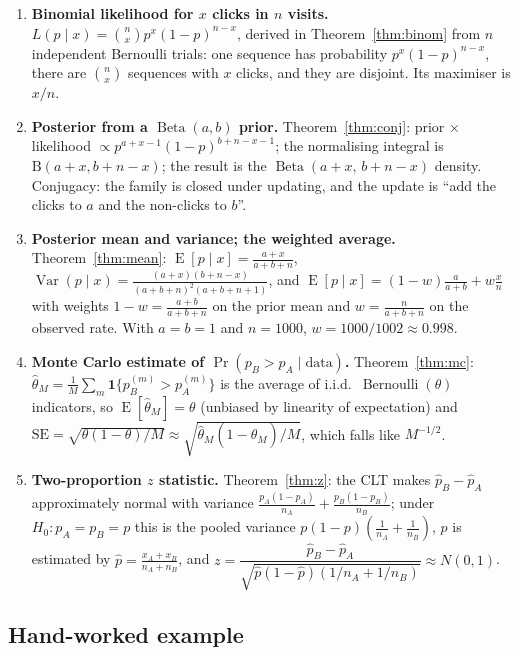 \documentclass[11pt]{article}
\theoremstyle{definition}
\theoremstyle{remark}
\renewcommand{\Pr}{\operatorname{Pr}}
\newcommand{\E}{\operatorname{E}}
\newcommand{\Var}{\operatorname{Var}}
\newcommand{\Ber}{\operatorname{Bernoulli}}
\newcommand{\Betad}{\operatorname{Beta}}
\newcommand{\Bfun}{\mathrm{B}}
\newcommand{\ind}[1]{\mathbf{1}\{#1\}}
\newcommand{\data}{\text{data}}
\begin{document}
\begin{enumerate}[label=\textbf{Q\arabic*.},leftmargin=*]
\item \textbf{Binomial likelihood for $x$ clicks in $n$ visits.}
  $L(p\mid x)=\binom nx p^x(1-p)^{n-x}$, derived in Theorem~\ref{thm:binom} from $n$ independent Bernoulli
  trials: one sequence has probability $p^x(1-p)^{n-x}$, there are $\binom nx$ sequences with $x$ clicks, and
  they are disjoint. Its maximiser is $x/n$.

\item \textbf{Posterior from a $\Betad(a,b)$ prior.}
  Theorem~\ref{thm:conj}: prior $\times$ likelihood $\propto p^{a+x-1}(1-p)^{b+n-x-1}$; the normalising
  integral is $\Bfun(a+x,b+n-x)$; the result is the $\Betad(a+x,\,b+n-x)$ density. Conjugacy: the family is
  closed under updating, and the update is ``add the clicks to $a$ and the non-clicks to $b$''.

\item \textbf{Posterior mean and variance; the weighted average.}
  Theorem~\ref{thm:mean}:
  $\E[p\mid x]=\frac{a+x}{a+b+n}$, $\Var(p\mid x)=\frac{(a+x)(b+n-x)}{(a+b+n)^2(a+b+n+1)}$, and
  $\E[p\mid x]=(1-w)\frac{a}{a+b}+w\frac xn$ with weights $1-w=\frac{a+b}{a+b+n}$ on the prior mean and
  $w=\frac{n}{a+b+n}$ on the observed rate. With $a=b=1$ and $n=1000$, $w=1000/1002\approx0.998$.

\item \textbf{Monte Carlo estimate of $\Pr(p_B>p_A\mid\data)$.}
  Theorem~\ref{thm:mc}: $\hat\theta_M=\frac1M\sum_m\ind{p_B^{(m)}>p_A^{(m)}}$ is the average of i.i.d.\
  $\Ber(\theta)$ indicators, so $\E[\hat\theta_M]=\theta$ (unbiased by linearity of expectation) and
  $\mathrm{SE}=\sqrt{\theta(1-\theta)/M}\approx\sqrt{\hat\theta_M(1-\hat\theta_M)/M}$, which falls like $M^{-1/2}$.

\item \textbf{Two-proportion $z$ statistic.}
  Theorem~\ref{thm:z}: the CLT makes $\hat p_B-\hat p_A$ approximately normal with variance
  $\frac{p_A(1-p_A)}{n_A}+\frac{p_B(1-p_B)}{n_B}$; under $H_0:p_A=p_B=p$ this is the pooled variance
  $p(1-p)(\frac1{n_A}+\frac1{n_B})$, $p$ is estimated by $\hat p=\frac{x_A+x_B}{n_A+n_B}$, and
  $z=\dfrac{\hat p_B-\hat p_A}{\sqrt{\hat p(1-\hat p)(1/n_A+1/n_B)}}\approx N(0,1)$.
\end{enumerate}

\subsection{Hand-worked example}\label{sec:small}
\end{document}

